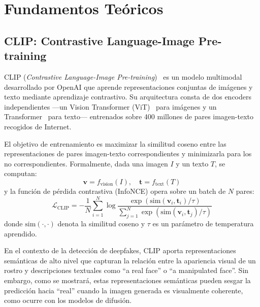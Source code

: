 \documentclass[pdflatex,sn-mathphys-num]{sn-jnl}
\begin{document}
\section{Fundamentos Teóricos}\label{sec:background}

\subsection{CLIP: Contrastive Language-Image Pre-training}\label{subsec:clip}

CLIP (\emph{Contrastive Language-Image Pre-training})~\cite{radford2021clip} es un modelo multimodal desarrollado por OpenAI que aprende representaciones conjuntas de imágenes y texto mediante aprendizaje contrastivo. Su arquitectura consta de dos encoders independientes ---un Vision Transformer (ViT)~\cite{dosovitskiy2020vit} para imágenes y un Transformer~\cite{vaswani2017attention} para texto--- entrenados sobre 400 millones de pares imagen-texto recogidos de Internet.

El objetivo de entrenamiento es maximizar la similitud coseno entre las representaciones de pares imagen-texto correspondientes y minimizarla para los no correspondientes. Formalmente, dada una imagen $I$ y un texto $T$, se computan:
\begin{equation}
    \mathbf{v} = f_{\text{vision}}(I), \quad \mathbf{t} = f_{\text{text}}(T)
\end{equation}
y la función de pérdida contrastiva (InfoNCE) opera sobre un batch de $N$ pares:
\begin{equation}
    \mathcal{L}_{\text{CLIP}} = -\frac{1}{N}\sum_{i=1}^{N} \log \frac{\exp(\text{sim}(\mathbf{v}_i, \mathbf{t}_i)/\tau)}{\sum_{j=1}^{N}\exp(\text{sim}(\mathbf{v}_i, \mathbf{t}_j)/\tau)}
    \label{eq:clip_loss}
\end{equation}
donde $\text{sim}(\cdot,\cdot)$ denota la similitud coseno y $\tau$ es un parámetro de temperatura aprendido.

En el contexto de la detección de deepfakes, CLIP aporta representaciones semánticas de alto nivel que capturan la relación entre la apariencia visual de un rostro y descripciones textuales como ``a real face'' o ``a manipulated face''. Sin embargo, como se mostrará, estas representaciones semánticas pueden sesgar la predicción hacia ``real'' cuando la imagen generada es visualmente coherente, como ocurre con los modelos de difusión.
\end{document}
